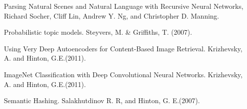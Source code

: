 \documentclass[letter,12pt,english]{article}
\begin{document}
  \begin{thebibliography}{1}

   Parsing Natural Scenes and Natural Language with Recursive Neural Networks, Richard Socher,
  Cliff Lin, Andrew Y. Ng, and Christopher D. Manning. 

   Probabilistic topic models. Steyvers, M. \& Griffiths, T. (2007).

   Using Very Deep Autoencoders for Content-Based Image Retrieval. Krizhevsky, A. and Hinton, G.E.(2011). 
  
   ImageNet Classification with Deep Convolutional Neural Networks. Krizhevsky, A. and Hinton, G.E.(2011). 
  
   Semantic Hashing. Salakhutdinov R. R, and Hinton, G. E.(2007). 
  
  \end{thebibliography}
\end{document}
